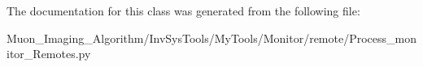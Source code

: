 The documentation for this class was generated from the following file\+:\begin{DoxyCompactItemize}
\item 
Muon\+\_\+\+Imaging\+\_\+\+Algorithm/\+Inv\+Sys\+Tools/\+My\+Tools/\+Monitor/remote/Process\+\_\+monitor\+\_\+\+Remotes.\+py\end{DoxyCompactItemize}
